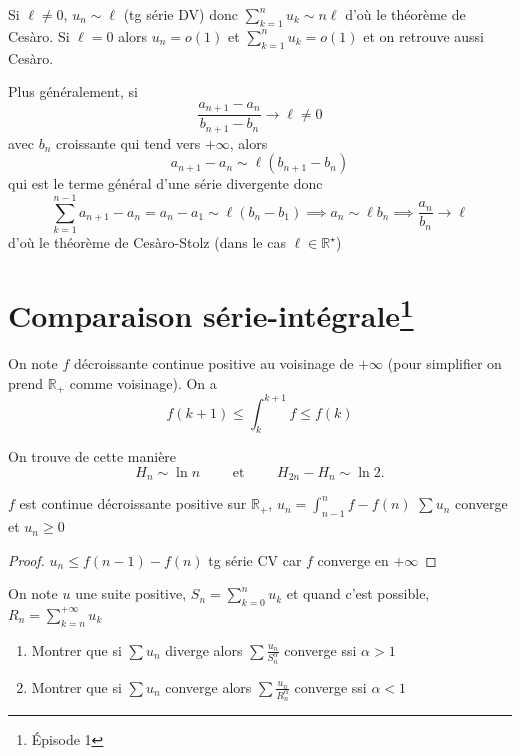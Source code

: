 \begin{rem}
    Si $\ell\neq 0$, $u_n\sim \ell$ (tg série DV) donc $\sum_{k=1}^nu_k\sim n\ell$ d'où le théorème de Cesàro. Si $\ell=0$ alors $u_n=o(1)$ et $\sum_{k=1}^nu_k=o(1)$ et on retrouve aussi Cesàro.

    Plus généralement, si \[
        \frac{a_{n+1}-a_n}{b_{n+1}-b_n}\longrightarrow\ell\neq 0
    \]
    avec $b_n$ croissante qui tend vers $+\infty$, alors \[
        a_{n+1}-a_n\sim \ell (b_{n+1}-b_n)
    \]
    qui est le terme général d'une série divergente donc \[
        \sum_{k=1}^{n-1}a_{n+1}-a_n=a_n-a_1\sim \ell (b_n-b_1) \implies a_n\sim \ell b_n\implies \frac{a_n}{b_n}\longrightarrow \ell
    \]
    d'où le théorème de Cesàro-Stolz (dans le cas $\ell\in\mathbb R^\star$)
\end{rem}

\section{Comparaison série-intégrale\texorpdfstring{\footnote{Épisode 1}}{}}

On note $f$ décroissante continue positive au voisinage de $+\infty$ (pour simplifier on prend $\mathbb R_+$ comme voisinage). On a \[
    f(k+1)\leq \int_k^{k+1}f\leq f(k)
\]

\begin{ex}
    On trouve de cette manière \[
        H_n\sim\ln n\qquad \text{ et }\qquad H_{2n}-H_n\sim \ln 2.
    \]
\end{ex}

\begin{thm}
    \Hyp $f$ est continue décroissante positive sur $\mathbb R_+$, $u_n=\displaystyle\int_{n-1}^n f-f(n)$
    \Conc $\sum u_n$ converge et $u_n\geq 0$
\end{thm}

\begin{proof}
    $u_n\leq f(n-1)-f(n)$ tg série CV car $f$ converge en $+\infty$
\end{proof}

\begin{exo}
    On note $u$ une suite positive, $S_n=\sum_{k=0}^nu_k$ et quand c'est possible, $R_n=\sum_{k=n}^{+\infty}u_k$
    \begin{enumerate}
        \item Montrer que si $\sum u_n$ diverge alors $\sum \frac{u_n}{S_n^\alpha}$ converge ssi $\alpha>1$
        \item Montrer que si $\sum u_n$ converge alors $\sum \frac{u_n}{R_n^\alpha}$ converge ssi $\alpha<1$
    \end{enumerate}
\end{exo}

